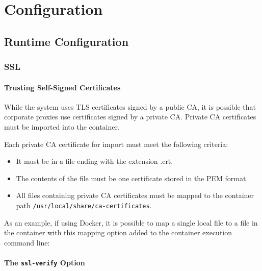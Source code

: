 \chapter{Configuration}


\section{Runtime Configuration}\label{sec:runtime-config}

\subsection{SSL}

\subsubsection{Trusting Self-Signed Certificates}\label{sec:self-signed-certs}

While the \cxone system uses TLS certificates signed by a public CA, it is possible that
corporate proxies use certificates signed by a private CA. Private CA certificates must be imported
into the \cxoneflow container.

Each private CA certificate for import must meet the following criteria:

\begin{itemize}
    \item It must be in a file ending with the extension .crt.
    \item The contents of the file must be one certificate stored in the PEM format.
    \item All files containing private CA certificates must be mapped to the container path \texttt{/usr/local/share/ca-certificates}.
\end{itemize}


As an example, if using Docker, it is possible to map a single local file to a file in the container with this mapping 
option added to the container execution command line:


\subsubsection{The \texttt{ssl-verify} Option}\label{sec:ssl-verify-general}

